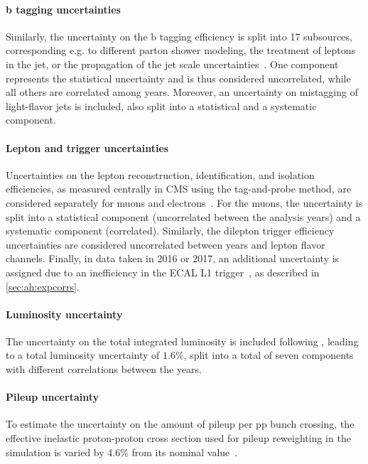 \paragraph{b tagging uncertainties}
Similarly, the uncertainty on the b tagging efficiency is split into 17 subsources, corresponding e.g. to different parton shower modeling, the treatment of leptons in the jet, or the propagation of the jet \pt scale uncertainties~\cite{CMS:BTV-16-002}. One component represents the statistical uncertainty and is thus considered uncorrelated, while all others are correlated among years. Moreover, an uncertainty on mistagging of light-flavor jets is included, also split into a statistical and a systematic component.

\paragraph{Lepton and trigger uncertainties}
Uncertainties on the lepton reconstruction, identification, and isolation efficiencies, as measured centrally in CMS using the tag-and-probe method, are considered separately for muons and electrons~\cite{CMS:EGM-17-001,CMS:MUO-16-001}. For the muons, the uncertainty is split into a statistical component (uncorrelated between the analysis years) and a systematic component (correlated). Similarly, the dilepton trigger efficiency uncertainties are considered uncorrelated between years and lepton flavor channels. Finally, in data taken in 2016 or 2017, an additional uncertainty is assigned due to an inefficiency in the ECAL L1 trigger~\cite{CMS:TRG-17-001}, as described in \cref{sec:ah:expcorrs}.

\paragraph{Luminosity uncertainty}
The uncertainty on the total integrated luminosity is included following , leading to a total luminosity uncertainty of $1.6\%$, split into a total of seven components with different correlations between the years.

\paragraph{Pileup uncertainty}
To estimate the uncertainty on the amount of pileup per pp bunch crossing, the effective inelastic proton-proton cross section used for pileup reweighting in the simulation is varied by 4.6\% from its nominal value~\cite{CMS:FSQ-15-005}.

